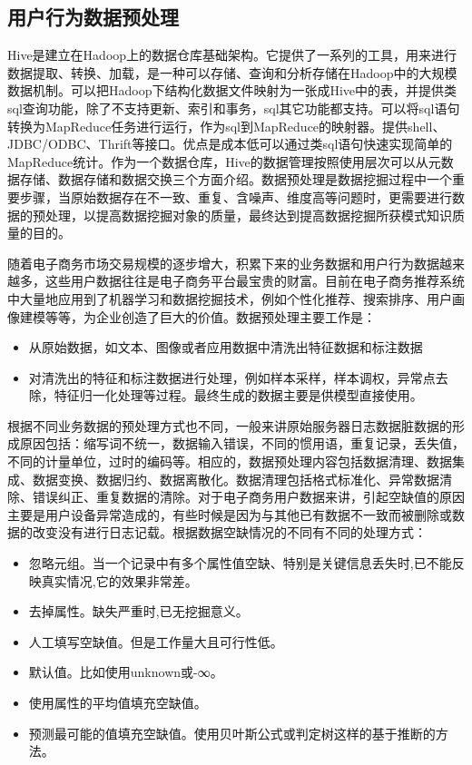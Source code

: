 		\subsection{用户行为数据预处理}
		Hive是建立在Hadoop上的数据仓库基础架构。它提供了一系列的工具，用来进行数据提取、转换、加载，是一种可以存储、查询和分析存储在Hadoop中的大规模数据机制。可以把Hadoop下结构化数据文件映射为一张成Hive中的表，并提供类sql查询功能，除了不支持更新、索引和事务，sql其它功能都支持。可以将sql语句转换为MapReduce任务进行运行，作为sql到MapReduce的映射器。提供shell、JDBC/ODBC、Thrift等接口。优点是成本低可以通过类sql语句快速实现简单的MapReduce统计。作为一个数据仓库，Hive的数据管理按照使用层次可以从元数据存储、数据存储和数据交换三个方面介绍。数据预处理是数据挖掘过程中一个重要步骤，当原始数据存在不一致、重复、含噪声、维度高等问题时，更需要进行数据的预处理，以提高数据挖掘对象的质量，最终达到提高数据挖掘所获模式知识质量的目的。
		
		随着电子商务市场交易规模的逐步增大，积累下来的业务数据和用户行为数据越来越多，这些用户数据往往是电子商务平台最宝贵的财富。目前在电子商务推荐系统中大量地应用到了机器学习和数据挖掘技术，例如个性化推荐、搜索排序、用户画像建模等等，为企业创造了巨大的价值。数据预处理主要工作是：
		\begin{itemize}
		\item 从原始数据，如文本、图像或者应用数据中清洗出特征数据和标注数据
		\item 对清洗出的特征和标注数据进行处理，例如样本采样，样本调权，异常点去除，特征归一化处理等过程。最终生成的数据主要是供模型直接使用。
		\end{itemize}
		根据不同业务数据的预处理方式也不同，一般来讲原始服务器日志数据脏数据的形成原因包括：缩写词不统一，数据输入错误，不同的惯用语，重复记录，丢失值，不同的计量单位，过时的编码等。相应的，数据预处理内容包括数据清理、数据集成、数据变换、数据归约、数据离散化。数据清理包括格式标准化、异常数据清除、错误纠正、重复数据的清除。对于电子商务用户数据来讲，引起空缺值的原因主要是用户设备异常造成的，有些时候是因为与其他已有数据不一致而被删除或数据的改变没有进行日志记载。根据数据空缺情况的不同有不同的处理方式：
		\begin{itemize}
		\item 忽略元组。当一个记录中有多个属性值空缺、特别是关键信息丢失时,已不能反映真实情况,它的效果非常差。
		\item 去掉属性。缺失严重时,已无挖掘意义。
		\item 人工填写空缺值。但是工作量大且可行性低。
		\item 默认值。比如使用unknown或-∞。
		\item 使用属性的平均值填充空缺值。
		\item 预测最可能的值填充空缺值。使用贝叶斯公式或判定树这样的基于推断的方法。
		\end{itemize}

